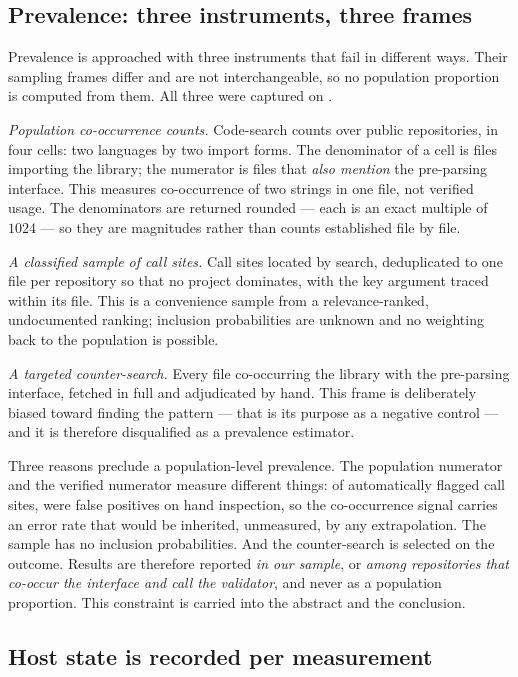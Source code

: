 \documentclass[pdflatex,sn-basic,twocolumn]{sn-jnl}%
\begin{document}
\subsection{Prevalence: three instruments, three frames}\label{sec:frames}

Prevalence is approached with three instruments that fail in different ways.
Their sampling frames differ and are not interchangeable, so no population
proportion is computed from them. All three were captured on \PopCapturedAt.

\emph{Population co-occurrence counts.} Code-search counts over public
repositories, in four cells: two languages by two import forms. The denominator
of a cell is files importing the library; the numerator is files that \emph{also
mention} the pre-parsing interface. This measures co-occurrence of two strings in
one file, not verified usage. The denominators are returned rounded --- each is
an exact multiple of $1024$ --- so they are magnitudes rather than counts
established file by file.

\emph{A classified sample of call sites.} Call sites located by search,
deduplicated to one file per repository so that no project dominates, with the
key argument traced within its file. This is a convenience sample from a
relevance-ranked, undocumented ranking; inclusion probabilities are unknown and
no weighting back to the population is possible.

\emph{A targeted counter-search.} Every file co-occurring the library with the
pre-parsing interface, fetched in full and adjudicated by hand. This frame is
deliberately biased toward finding the pattern --- that is its purpose as a
negative control --- and it is therefore disqualified as a prevalence estimator.

Three reasons preclude a population-level prevalence. The population numerator
and the verified numerator measure different things: of \AdjudicatedTotal{}
automatically flagged call sites, \AdjudicatedFalsePositive{} were false
positives on hand inspection, so the co-occurrence signal carries an error rate
that would be inherited, unmeasured, by any extrapolation. The sample has no
inclusion probabilities. And the counter-search is selected on the outcome.
Results are therefore reported \emph{in our sample}, or \emph{among repositories
that co-occur the interface and call the validator}, and never as a population
proportion. This constraint is carried into the abstract and the conclusion.

\subsection{Host state is recorded per measurement}\label{sec:hoststate}
\end{document}
